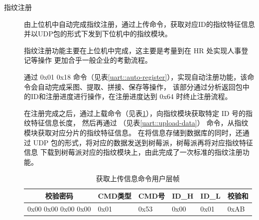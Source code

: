     \begin{description}
        \item[指纹注册] 由上位机中自动完成指纹注册，通过上传命令，获取对应ID的指纹特征信息并以UDP包的形式下发到下位机中的指纹模块。
        
        指纹注册功能主要在上位机中完成，这主要是考量到在 HR 处实现人事登记等操作
        更加合乎一般企业的考勤流程。
        
        通过 0x01 0x18 命令（见表\ref{uart::auto-register}），实现自动注册功能，该命令会自动完成采图、提取、拼接、保存等操作，
        该部分通过分析返回包中的ID和注册进度进行操作，在注册进度达到 0x64 时终止注册流程。

        \begin{table}[htbp]
            \caption{自动注册命令用户层帧} \label{uart::auto-register}
        \end{table}

        在注册完成之后，通过上载命令（见表\ref{uart::upload-info}），向指纹模块获取特定 ID 号的指纹特征信息长度，
        然后再通过 （见表\ref{uart::upload-data}） 命令，从指纹模块获取对应分片的指纹特征信息。
        在将信息存储到数据库的同时，还通过 UDP 包的形式，将对应的数据发送到树莓派，树莓派再将对应指纹特征信息
        下载到树莓派对应的指纹模块上，由此完成了一次标准的指纹注册功能。

        \begin{table}[htbp]
            \centering
            \caption{获取上传信息命令用户层帧} \label{uart::upload-info}
            \begin{tabular}{llllll}
            \hline
            \multicolumn{1}{c}{校验密码} & CMD类型 & CMD号 & ID\_H & ID\_L & 校验和  \\ \hline
            0x00 0x00 0x00 0x00        & 0x01  & 0x53 & 0x00  & 0x01  & 0xAB \\ \hline
            \end{tabular}
        \end{table}


\end{description}

